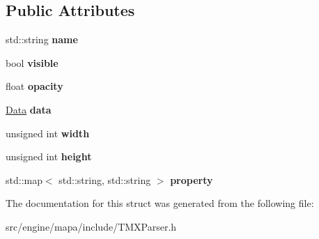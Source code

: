 \subsection*{Public Attributes}
\begin{DoxyCompactItemize}
\item 
std\+::string {\bfseries name}\hypertarget{struct_t_m_x_1_1_parser_1_1_tile_layer_a7d5277b669e6d9e5f683fa32ed948582}{}\label{struct_t_m_x_1_1_parser_1_1_tile_layer_a7d5277b669e6d9e5f683fa32ed948582}

\item 
bool {\bfseries visible}\hypertarget{struct_t_m_x_1_1_parser_1_1_tile_layer_ab76d68b9ac635f5b1e1d2c9b9e50b1b1}{}\label{struct_t_m_x_1_1_parser_1_1_tile_layer_ab76d68b9ac635f5b1e1d2c9b9e50b1b1}

\item 
float {\bfseries opacity}\hypertarget{struct_t_m_x_1_1_parser_1_1_tile_layer_a896ddde50774b47d4532bf364062dc0f}{}\label{struct_t_m_x_1_1_parser_1_1_tile_layer_a896ddde50774b47d4532bf364062dc0f}

\item 
\hyperlink{struct_t_m_x_1_1_parser_1_1_data}{Data} {\bfseries data}\hypertarget{struct_t_m_x_1_1_parser_1_1_tile_layer_a695d53dc4e1d4bc362be57d95990ebea}{}\label{struct_t_m_x_1_1_parser_1_1_tile_layer_a695d53dc4e1d4bc362be57d95990ebea}

\item 
unsigned int {\bfseries width}\hypertarget{struct_t_m_x_1_1_parser_1_1_tile_layer_ad931eb0205ba5b16b623a372542d9b61}{}\label{struct_t_m_x_1_1_parser_1_1_tile_layer_ad931eb0205ba5b16b623a372542d9b61}

\item 
unsigned int {\bfseries height}\hypertarget{struct_t_m_x_1_1_parser_1_1_tile_layer_a3970417d8aa48baf738b1ff2d8823416}{}\label{struct_t_m_x_1_1_parser_1_1_tile_layer_a3970417d8aa48baf738b1ff2d8823416}

\item 
std\+::map$<$ std\+::string, std\+::string $>$ {\bfseries property}\hypertarget{struct_t_m_x_1_1_parser_1_1_tile_layer_a357e8b3c9cbb813d352b0b183d73d7b0}{}\label{struct_t_m_x_1_1_parser_1_1_tile_layer_a357e8b3c9cbb813d352b0b183d73d7b0}

\end{DoxyCompactItemize}


The documentation for this struct was generated from the following file\+:\begin{DoxyCompactItemize}
\item 
src/engine/mapa/include/T\+M\+X\+Parser.\+h\end{DoxyCompactItemize}
